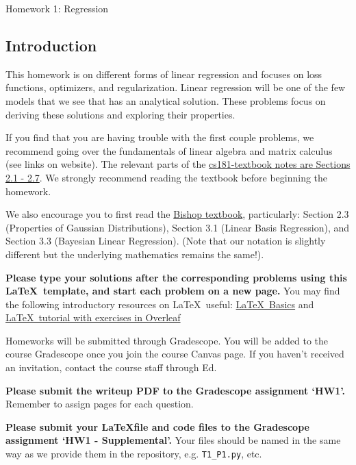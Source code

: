\documentclass[submit]{harvardml}
\begin{document}
\begin{center}
{\Large Homework 1: Regression}\\
\end{center}

\subsection*{Introduction}
This homework is on different forms of linear regression and focuses
on loss functions, optimizers, and regularization. Linear regression
will be one of the few models that we see that has an analytical
solution.  These problems focus on deriving these solutions and
exploring their properties.

If you find that you are having trouble with the first couple
problems, we recommend going over the fundamentals of linear algebra
and matrix calculus (see links on website).  The relevant parts of the
\href{https://github.com/harvard-ml-courses/cs181-textbook/blob/master/Textbook.pdf}{cs181-textbook notes are Sections 2.1 - 2.7}.  We strongly recommend
reading the textbook before beginning the homework.

    We also encourage you to first read the \href{http://users.isr.ist.utl.pt/~wurmd/Livros/school/Bishop\%20-\%20Pattern\%20Recognition\%20And\%20Machine\%20Learning\%20-\%20Springer\%20\%202006.pdf}{Bishop textbook}, particularly:
Section 2.3 (Properties of Gaussian Distributions), Section 3.1
(Linear Basis Regression), and Section 3.3 (Bayesian Linear
Regression). (Note that our notation is slightly different but the
underlying mathematics remains the same!).

\textbf{Please type your solutions after the corresponding problems using this
\LaTeX\ template, and start each problem on a new page.} You may find
the following introductory resources on \LaTeX\ useful: 
\href{http://www.mjdenny.com/workshops/LaTeX_Intro.pdf}{\LaTeX\ Basics} 
and \href{https://www.overleaf.com/learn/latex/Free_online_introduction_to_LaTeX_(part_1)}{\LaTeX\ tutorial with exercises in Overleaf}

Homeworks will be submitted through Gradescope. You will be added to
the course Gradescope once you join the course Canvas page. If you
haven't received an invitation, contact the course staff through Ed.

\textbf{Please submit the writeup PDF to the Gradescope assignment
  `HW1'.} Remember to assign pages for each question.

\textbf{Please submit your \LaTeX file and code files to the
  Gradescope assignment `HW1 - Supplemental'.} Your files should be
named in the same way as we provide them in the repository,
e.g. \texttt{T1\_P1.py}, etc.
\end{document}
